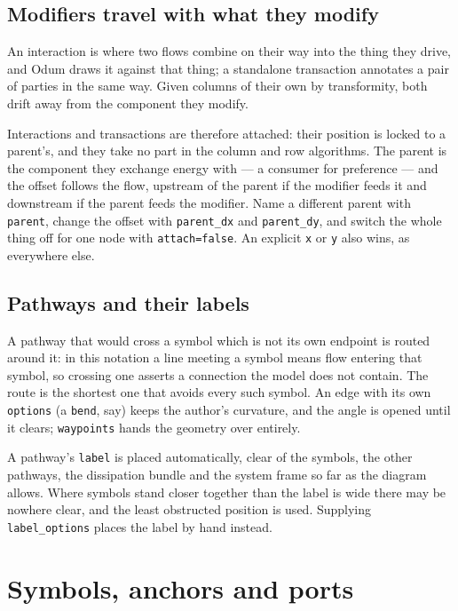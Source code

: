 \documentclass{article}
\begin{document}
\subsection{Modifiers travel with what they modify}

An interaction is where two flows combine on their way into the thing they
drive, and Odum draws it against that thing; a standalone transaction annotates
a pair of parties in the same way. Given columns of their own by transformity,
both drift away from the component they modify.

Interactions and transactions are therefore attached: their position is locked
to a parent's, and they take no part in the column and row algorithms. The
parent is the component they exchange energy with --- a consumer for preference
--- and the offset follows the flow, upstream of the parent if the modifier
feeds it and downstream if the parent feeds the modifier. Name a different
parent with \texttt{parent}, change the offset with \texttt{parent\_dx} and
\texttt{parent\_dy}, and switch the whole thing off for one node with
\texttt{attach=false}. An explicit \texttt{x} or \texttt{y} also wins, as
everywhere else.

\subsection{Pathways and their labels}

A pathway that would cross a symbol which is not its own endpoint is routed
around it: in this notation a line meeting a symbol means flow entering that
symbol, so crossing one asserts a connection the model does not contain. The
route is the shortest one that avoids every such symbol. An edge with its own
\texttt{options} (a \texttt{bend}, say) keeps the author's curvature, and the
angle is opened until it clears; \texttt{waypoints} hands the geometry over
entirely.

A pathway's \texttt{label} is placed automatically, clear of the symbols, the
other pathways, the dissipation bundle and the system frame so far as the
diagram allows. Where symbols stand closer together than the label is wide there
may be nowhere clear, and the least obstructed position is used. Supplying
\texttt{label\_options} places the label by hand instead.

\section{Symbols, anchors and ports}
\label{sec:symbols}
\end{document}
